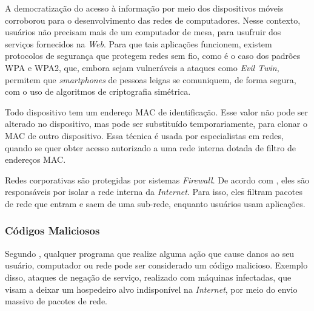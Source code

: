     \vspace{4mm}
    
    \hspace{1cm}
    A democratização do acesso à informação por meio dos dispositivos móveis corroborou para o desenvolvimento das redes de computadores. Nesse contexto, usuários não precisam mais de um computador de mesa, para usufruir dos serviços fornecidos na \textit{Web}. Para que tais aplicações funcionem, existem protocolos de segurança que protegem redes sem fio, como é o caso dos padrões WPA e WPA2, que, embora sejam vulneráveis a ataques como \textit{Evil Twin}, permitem que \textit{smartphones} de pessoas leigas se comuniquem, de forma segura, com o uso de algoritmos de criptografia simétrica.
    
    \vspace{4mm}
    
    \hspace{1cm}
    Todo dispositivo tem um endereço MAC de identificação. Esse valor não pode ser alterado no dispositivo, mas pode ser substituído temporariamente, para clonar o MAC de outro dispositivo. Essa técnica é usada por especialistas em redes, quando se quer obter acesso autorizado a uma rede interna dotada de filtro de endereços MAC.
    
    \vspace{4mm}
    
    \hspace{1cm}
    Redes corporativas são protegidas por sistemas \textit{Firewall}. De acordo com , eles são responsáveis por isolar a rede interna da \textit{Internet}. Para isso, eles filtram pacotes de rede que entram e saem de uma sub-rede, enquanto usuários usam aplicações.

    \subsubsection{Códigos Maliciosos} \label{cap1_visao_geral_malware}

    \hspace{1cm}
    Segundo , qualquer programa que realize alguma ação que cause danos ao seu usuário, computador ou rede pode ser considerado um código malicioso. Exemplo disso, ataques de negação de serviço, realizado com máquinas infectadas, que visam a deixar um hospedeiro alvo indisponível na \textit{Internet}, por meio do envio massivo de pacotes de rede. 
    
    \vspace{4mm}
    
